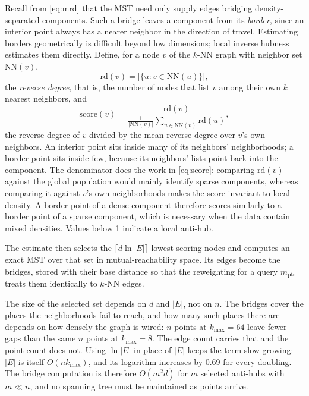\documentclass{ieeeaccess}
\newcommand{\kmax}{k_{\max}}
\newcommand{\mpts}{m_{\mathrm{pts}}}
\begin{document}
Recall from \eqref{eq:mrd} that the MST need only supply edges bridging
density-separated components. Such a bridge leaves a component from its
\emph{border}, since an interior point always has a nearer neighbor in the
direction of travel. Estimating borders geometrically is difficult beyond low
dimensions; local inverse hubness estimates them directly. Define, for a node
$v$ of the $k$-NN graph with neighbor set $\mathrm{NN}(v)$,
\begin{equation}
\label{eq:rd}
\mathrm{rd}(v) = |\{ u : v \in \mathrm{NN}(u) \}|,
\end{equation}
the \emph{reverse degree}, that is, the number of nodes that list $v$ among
their own $k$ nearest neighbors, and
\begin{equation}
\label{eq:score}
\mathrm{score}(v) = \frac{\mathrm{rd}(v)}
     {\frac{1}{|\mathrm{NN}(v)|}\sum_{u \in \mathrm{NN}(v)} \mathrm{rd}(u)},
\end{equation}
the reverse degree of $v$ divided by the mean reverse degree over $v$'s own
neighbors. An interior point sits inside many of its neighbors'
neighborhoods; a border point sits inside few, because its neighbors' lists
point back into the component. The denominator does the work in
\eqref{eq:score}:
comparing $\mathrm{rd}(v)$ against the global population would mainly identify
sparse components, whereas comparing it against $v$'s own neighborhoods makes
the score invariant to local density. A border point of a dense component
therefore scores similarly to a border point of a sparse component, which is
necessary when the data contain mixed densities. Values below 1 indicate a local
anti-hub.

The estimate then selects the $\lceil d \ln |E| \rceil$ lowest-scoring nodes and
computes an exact MST over that set in mutual-reachability space. Its edges
become the bridges, stored with their base distance so that the reweighting for
a query $\mpts$ treats them identically to $k$-NN edges.

The size of the selected set depends on $d$ and $|E|$, not on $n$. The bridges
cover the places the neighborhoods fail to reach, and how many such places there
are depends on how densely the graph is wired: $n$ points at $\kmax = 64$ leave
fewer gaps than the same $n$ points at $\kmax = 8$. The edge count carries that
and the point count does not. Using
$\ln |E|$ in place of $|E|$ keeps the term slow-growing: $|E|$ is itself
$O(n\kmax)$, and its logarithm increases by 0.69 for every doubling. The bridge computation is therefore $O(m^2 d)$ for $m$ selected
anti-hubs with $m \ll n$, and no spanning tree must be maintained as points
arrive.
\end{document}
